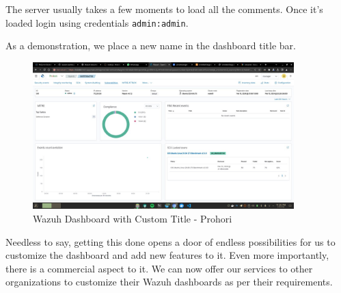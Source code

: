 The server usually takes a few moments to load all the comments. Once it's loaded login using credentials \texttt{admin:admin}.

As a demonstration, we place a new name in the dashboard title bar.
    \begin{figure} [H]
        \centering
        \includegraphics[width=0.9\textwidth]{images/prohori.jpg}
        \caption{Wazuh Dashboard with Custom Title - Prohori}
        \label{fig:prohori}
    \end{figure}
Needless to say, getting this done opens a door of endless possibilities for us to customize the dashboard and add new features to it. Even more importantly, there is a commercial aspect to it. We can now offer our services to other organizations to customize their Wazuh dashboards as per their requirements.